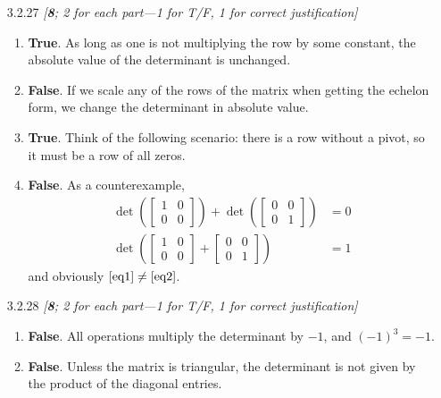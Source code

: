 \documentclass{amsart}
\theoremstyle{definition}
\theoremstyle{definition}
\DeclareMathOperator{\1}{\mathbbm{1}}
\begin{document}
	
	\begin{enumerate}[itemsep = 2mm]
		\item[3.2.27] \textit{[\textbf{8}; 2 for each part---1 for T/F, 1 for correct justification]}
		
		\begin{enumerate}
			\item \textbf{True}. As long as one is not multiplying the row by some constant, the absolute value of the determinant is unchanged.
			
			
			\item \textbf{False}. If we scale any of the rows of the matrix when getting the echelon form, we change the determinant in absolute value.
			
			
			\item \textbf{True}. Think of the following scenario: there is a row without a pivot, so it must be a row of all zeros.
			
			
			\item \textbf{False}. As a counterexample,
			\begin{align}
				\label{eq1} \det \left( \begin{bmatrix} 1 & 0 \\ 0 & 0 \end{bmatrix} \right) + \det  \left( \begin{bmatrix}  0 & 0 \\ 0 & 1  \end{bmatrix} \right) &= 0 \\
				\label{eq2} \det \left( \begin{bmatrix} 1 & 0 \\ 0 & 0 \end{bmatrix} + \begin{bmatrix}  0 & 0 \\ 0 & 1  \end{bmatrix} \right) &= 1
			\end{align}
			and obviously $\eqref{eq1} \neq \eqref{eq2}$.
		\end{enumerate}


		\item[3.2.28] \textit{[\textbf{8}; 2 for each part---1 for T/F, 1 for correct justification]}
		
		\begin{enumerate}
			\item \textbf{False}. All operations multiply the determinant by $-1$, and $(-1)^3 = -1$.
			
			
			\item \textbf{False}. Unless the matrix is triangular, the determinant is not given by the product of the diagonal entries.
			

\end{enumerate}
\end{enumerate}
\end{document}
